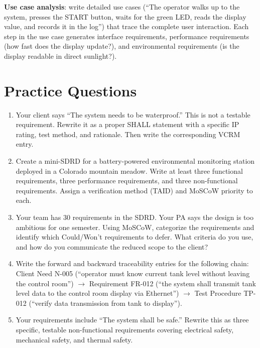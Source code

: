 \textbf{Use case analysis}: write detailed use cases (``The operator walks up to the system, presses the START button, waits for the green LED, reads the display value, and records it in the log'') that trace the complete user interaction. Each step in the use case generates interface requirements, performance requirements (how fast does the display update?), and environmental requirements (is the display readable in direct sunlight?).


\section{Practice Questions}
\begin{enumerate}[leftmargin=1.5em]
\item Your client says ``The system needs to be waterproof.'' This is not a testable requirement. Rewrite it as a proper SHALL statement with a specific IP rating, test method, and rationale. Then write the corresponding VCRM entry.
\item Create a mini-SDRD for a battery-powered environmental monitoring station deployed in a Colorado mountain meadow. Write at least three functional requirements, three performance requirements, and three non-functional requirements. Assign a verification method (TAID) and MoSCoW priority to each.
\item Your team has 30 requirements in the SDRD. Your PA says the design is too ambitious for one semester. Using MoSCoW, categorize the requirements and identify which Could/Won't requirements to defer. What criteria do you use, and how do you communicate the reduced scope to the client?
\item Write the forward and backward traceability entries for the following chain: Client Need N-005 (``operator must know current tank level without leaving the control room'') $\to$ Requirement FR-012 (``the system shall transmit tank level data to the control room display via Ethernet'') $\to$ Test Procedure TP-012 (``verify data transmission from tank to display'').
\item Your requirements include ``The system shall be safe.'' Rewrite this as three specific, testable non-functional requirements covering electrical safety, mechanical safety, and thermal safety.
\end{enumerate}



